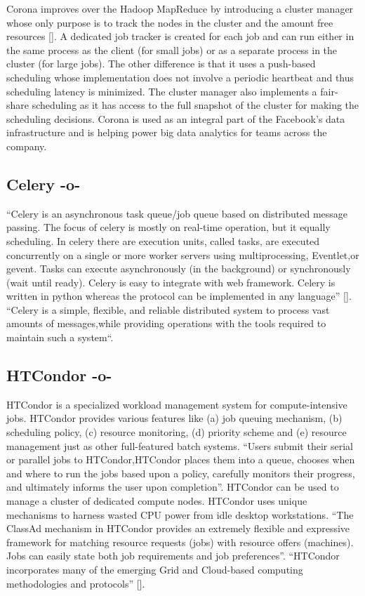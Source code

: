 Corona improves over the Hadoop MapReduce by introducing a cluster
manager whose only purpose is to track the nodes in the cluster and
the amount free resources [\cite{www-facebook-corona}]. A dedicated job
tracker is created for each job and can run either in the same process
as the client (for small jobs) or as a separate process in the cluster
(for large jobs). The other difference is that it uses a push-based
scheduling whose implementation does not involve a periodic heartbeat
and thus scheduling latency is minimized. The cluster manager also
implements a fair-share scheduling as it has access to the full
snapshot of the cluster for making the scheduling decisions. Corona is
used as an integral part of the Facebook's data infrastructure and is
helping power big data analytics for teams across the company.
     
\subsection{Celery -o-}

``Celery is an asynchronous task queue/job queue based on distributed
message passing.  The focus of celery is mostly on real-time
operation, but it equally scheduling.  In celery there are execution
units, called tasks, are executed concurrently on a single or more
worker servers using multiprocessing, Eventlet,or gevent.  Tasks can
execute asynchronously (in the background) or synchronously (wait
until ready).  Celery is easy to integrate with web framework. Celery
is written in python whereas the protocol can be implemented in any
language'' [\cite{celery}]. ``Celery is a simple, flexible, and reliable
distributed system to process vast amounts of messages,while providing
operations with the tools required to maintain such a
system``\cite{celerydocs}.



     
\subsection{HTCondor -o-}

    
HTCondor is a specialized workload management system for
compute-intensive jobs.  HTCondor provides various features like (a) job
queuing mechanism, (b) scheduling policy, (c) resource monitoring,
(d) priority scheme and (e) resource management just as other
full-featured batch systems.  ``Users submit their serial or parallel
jobs to HTCondor,HTCondor places them into a queue, chooses when and
where to run the jobs based upon a policy, carefully monitors their
progress, and ultimately informs the user upon completion''.  HTCondor
can be used to manage a cluster of dedicated compute nodes. HTCondor
uses unique mechanisms to harness wasted CPU power from idle desktop
workstations. ``The ClassAd mechanism in HTCondor provides an
extremely flexible and expressive framework for matching resource
requests (jobs) with resource offers (machines).  Jobs can easily
state both job requirements and job preferences''.  ``HTCondor
incorporates many of the emerging Grid and Cloud-based computing
methodologies and protocols'' [\cite{htcondor}].



